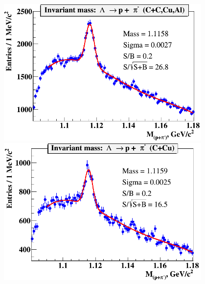\documentclass[dvipsnames] {beamer}
\begin{document}
\begin{frame}
\begin{columns}[t]
\begin{block}{\bf {}}
\begin{figure}[H]
       \end{figure}
     \end{block}
    \begin{block}{\bf {}}  
      \begin{minipage}{.49\linewidth}
        \includegraphics[width=1.\linewidth]{lambda_all.png} \\ 
        \includegraphics[width=1.\linewidth]{lambda_Cu.png}
      \end{minipage}
      \begin{minipage}{.49\linewidth}

\end{minipage}
\end{block}
\end{columns}
\end{frame}
\end{document}
